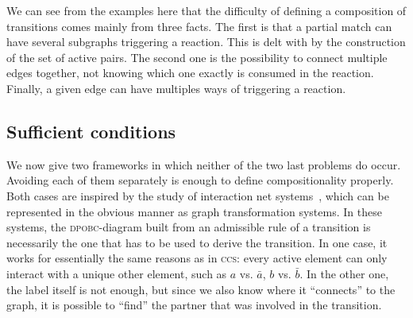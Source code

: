 We can see from the examples here that the difficulty of defining a composition of transitions comes mainly from three facts. 
The first is that a partial match can have several subgraphs triggering a reaction. 
This is delt with by the construction of the set of active pairs.
The second one is the possibility to connect multiple edges together, not knowing which one exactly is consumed in the reaction. 
Finally,  a given edge can have multiples ways of triggering a reaction.

\subsection{Sufficient conditions}
We now give two frameworks in which neither of the two last problems do occur. 
Avoiding each of them separately is enough to define compositionality properly.
Both cases  are inspired by the study of interaction net systems~\cite{Laf95,EhrReg06,MazzaPhd06},
which can be represented in the 
{}obvious{}    manner as graph transformation systems. 
In these systems, 
the \textsc{dpobc}-diagram built from an admissible rule of a transition is necessarily the one that has to be used to derive the transition. 
In one case, 
it works for essentially the same reasons as in \textsc{ccs}: 
every active element can only interact with a unique other element, 
such as $a$ vs. $\bar a$, $b$ vs. $\bar b$.
In the other one, 
the label itself is not enough, 
but since we also know where it ``connects'' to the graph, 
it is possible to ``find'' the partner that was involved in the transition.

